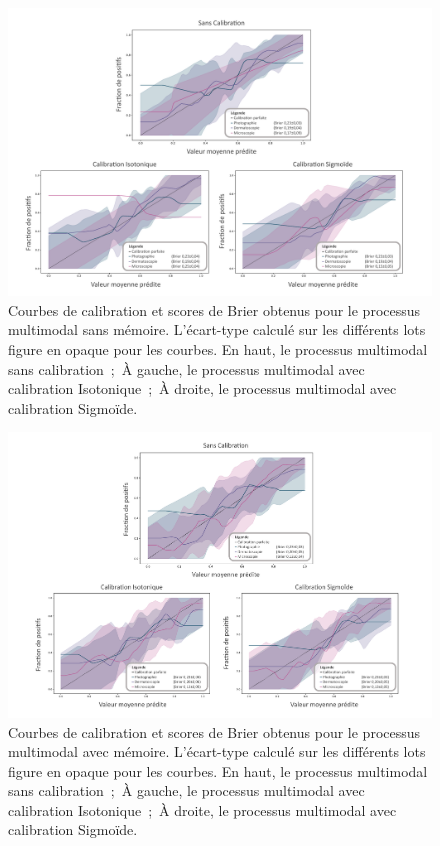\begin{landscape}
    \begin{figure}[H]
        \centering
        \includegraphics[width=0.8\linewidth]{contents/chapter_8/resources/results_calibration_sequential.pdf}
        \caption{Courbes de calibration et scores de Brier obtenus pour le processus multimodal sans mémoire. L'écart-type calculé sur les différents lots figure en opaque pour les courbes. En haut, le processus multimodal sans calibration~;~À gauche, le processus multimodal avec calibration Isotonique~;~À droite, le processus multimodal avec calibration Sigmoïde.}
        \label{fig:results_calibration_sequential}
    \end{figure}
\end{landscape}

\begin{landscape}
    \begin{figure}[H]
        \centering
        \includegraphics[width=0.8\linewidth]{contents/chapter_8/resources/results_calibration_cumulative.pdf}
        \caption{Courbes de calibration et scores de Brier obtenus pour le processus multimodal avec mémoire. L'écart-type calculé sur les différents lots figure en opaque pour les courbes. En haut, le processus multimodal sans calibration~;~À gauche, le processus multimodal avec calibration Isotonique~;~À droite, le processus multimodal avec calibration Sigmoïde.}
        \label{fig:results_calibration_cumulative}
    \end{figure}
\end{landscape}

